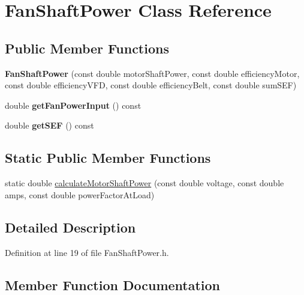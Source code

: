\hypertarget{class_fan_shaft_power}{}\section{Fan\+Shaft\+Power Class Reference}
\label{class_fan_shaft_power}
\subsection*{Public Member Functions}
\begin{DoxyCompactItemize}
\item 
\mbox{\label{class_fan_shaft_power_afe665bc2baf1a876d265ebc9129f70e2}} 
{\bfseries Fan\+Shaft\+Power} (const double motor\+Shaft\+Power, const double efficiency\+Motor, const double efficiency\+V\+FD, const double efficiency\+Belt, const double sum\+S\+EF)
\item 
\mbox{\label{class_fan_shaft_power_a6008dad9482c28d652c6075185d050e9}} 
double {\bfseries get\+Fan\+Power\+Input} () const
\item 
\mbox{\label{class_fan_shaft_power_a7a36d22c2301d3c634fc89e103daa148}} 
double {\bfseries get\+S\+EF} () const
\end{DoxyCompactItemize}
\subsection*{Static Public Member Functions}
\begin{DoxyCompactItemize}
\item 
static double \hyperlink{class_fan_shaft_power_aa1928514508aed582dc9b11127b4546a}{calculate\+Motor\+Shaft\+Power} (const double voltage, const double amps, const double power\+Factor\+At\+Load)
\end{DoxyCompactItemize}


\subsection{Detailed Description}


Definition at line 19 of file Fan\+Shaft\+Power.\+h.



\subsection{Member Function Documentation}
\mbox{\label{class_fan_shaft_power_aa1928514508aed582dc9b11127b4546a}} 
